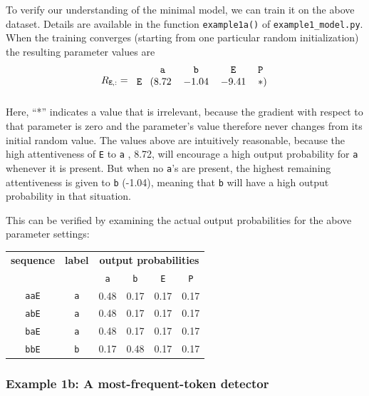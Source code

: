 \documentclass{article}
\newcommand{\ta}{\mathtt{a}}
\newcommand{\tb}{\mathtt{b}}
\newcommand{\tE}{\mathtt{E}}
\newcommand{\tP}{\mathtt{P}}
\begin{document}
To verify our understanding of the minimal model, we can train it on
the above dataset. Details are available in the function
\texttt{example1a()} of \texttt{example1\_model.py}. When the training
converges (starting from one particular random initialization) the
resulting parameter values are
\begin{displaymath}
  R_{\tE,:} =
  \begin{blockarray}{ccccc}
       & \ta & \tb & \tE & \tP  \\
      \begin{block}{r(cccc)}
        \tE &  8.72 & -1.04 & -9.41 & * \\
      \end{block}
    \end{blockarray} \\
\end{displaymath}
Here, ``*'' indicates a value that is irrelevant, because the gradient
with respect to that parameter is zero and the parameter's value
therefore never changes from its initial random value. The values
above are intuitively reasonable, because the high attentiveness of
\texttt{E} to \texttt{a} , 8.72, will encourage a high output
probability for \texttt{a} whenever it is present. But when no
\texttt{a}'s are present, the highest remaining attentiveness is given
to \texttt{b} (-1.04), meaning that \texttt{b} will have a high output
probability in that situation.

This can be verified by examining the actual output probabilities for
the above parameter settings:
\begin{center}
\begin{tabular}{cccccc}
  \textbf{sequence} & \textbf{label} & \multicolumn{4}{c}{\textbf{output probabilities}} \\
  & & \texttt{a} & \texttt{b} & \texttt{E} & \texttt{P} \\
  \texttt{aaE} & \texttt{a} & 0.48 & 0.17 & 0.17 & 0.17 \\
  \texttt{abE} & \texttt{a} & 0.48 & 0.17 & 0.17 & 0.17 \\
  \texttt{baE} & \texttt{a} & 0.48 & 0.17 & 0.17 & 0.17 \\
  \texttt{bbE} & \texttt{b} & 0.17 & 0.48 & 0.17 & 0.17 \\
\end{tabular}
\end{center}




\subsubsection*{Example 1b: A most-frequent-token detector}
\end{document}
